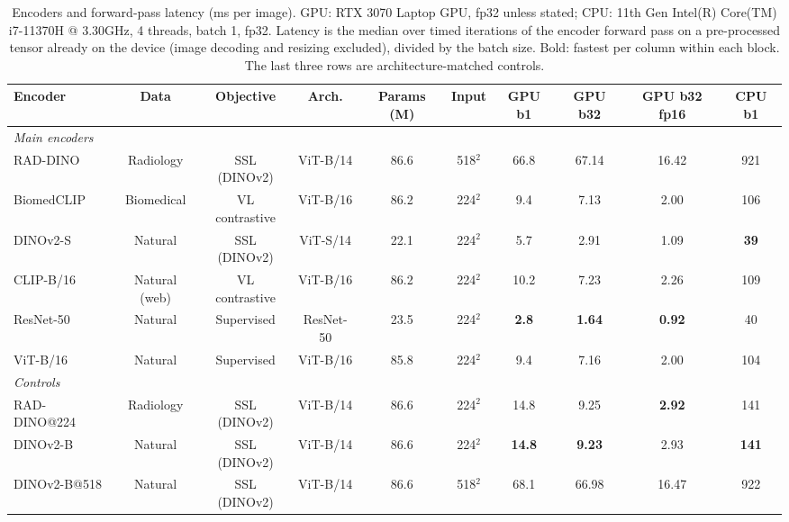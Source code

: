 \begin{table}[H]\centering
\scriptsize
\caption{Encoders and forward-pass latency (ms per image). GPU: RTX 3070 Laptop GPU, fp32 unless stated; CPU: 11th Gen Intel(R) Core(TM) i7-11370H @ 3.30GHz, 4 threads, batch 1, fp32. Latency is the median over timed iterations of the encoder forward pass on a pre-processed tensor already on the device (image decoding and resizing excluded), divided by the batch size. Bold: fastest per column within each block. The last three rows are architecture-matched controls.}\label{tab:encoders}
\begin{adjustbox}{max width=\linewidth}
\begin{tabular}{lccccccccc}
\toprule
Encoder & Data & Objective & Arch. & Params (M) & Input & GPU b1 & GPU b32 & GPU b32 fp16 & CPU b1 \\
\midrule

\multicolumn{10}{l}{\emph{Main encoders}} \\
RAD-DINO & Radiology & SSL (DINOv2) & ViT-B/14 & 86.6 & 518$^2$ & 66.8 & 67.14 & 16.42 & 921 \\
BiomedCLIP & Biomedical & VL contrastive & ViT-B/16 & 86.2 & 224$^2$ & 9.4 & 7.13 & 2.00 & 106 \\
DINOv2-S & Natural & SSL (DINOv2) & ViT-S/14 & 22.1 & 224$^2$ & 5.7 & 2.91 & 1.09 & \textbf{39} \\
CLIP-B/16 & Natural (web) & VL contrastive & ViT-B/16 & 86.2 & 224$^2$ & 10.2 & 7.23 & 2.26 & 109 \\
ResNet-50 & Natural & Supervised & ResNet-50 & 23.5 & 224$^2$ & \textbf{2.8} & \textbf{1.64} & \textbf{0.92} & 40 \\
ViT-B/16 & Natural & Supervised & ViT-B/16 & 85.8 & 224$^2$ & 9.4 & 7.16 & 2.00 & 104 \\
\midrule
\multicolumn{10}{l}{\emph{Controls}} \\
RAD-DINO@224 & Radiology & SSL (DINOv2) & ViT-B/14 & 86.6 & 224$^2$ & 14.8 & 9.25 & \textbf{2.92} & 141 \\
DINOv2-B & Natural & SSL (DINOv2) & ViT-B/14 & 86.6 & 224$^2$ & \textbf{14.8} & \textbf{9.23} & 2.93 & \textbf{141} \\
DINOv2-B@518 & Natural & SSL (DINOv2) & ViT-B/14 & 86.6 & 518$^2$ & 68.1 & 66.98 & 16.47 & 922 \\
\bottomrule
\end{tabular}
\end{adjustbox}
\end{table}
